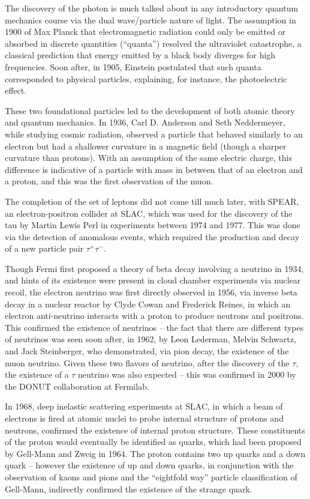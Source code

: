 The discovery of the photon is much talked about in any introductory quantum mechanics course via the 
dual wave/particle nature of light. The assumption in 1900 of Max Planck that electromagnetic radiation could only be 
emitted or absorbed in discrete quantities (``quanta'') resolved the ultraviolet catastrophe, a classical 
prediction that energy emitted by a black body diverges for high frequencies. Soon after, in 1905, Einstein postulated 
that such quanta corresponded to physical particles, explaining, for instance, the photoelectric effect.

These two foundational particles led to the development of both atomic theory and quantum mechanics. In 
1936, Carl D. Anderson and Seth Neddermeyer, while studying cosmic radiation, observed a particle that 
behaved similarly to an electron but had a shallower curvature in a magnetic field (though a sharper curvature 
than protons). With an assumption of the same electric charge, this difference is indicative of a particle 
with mass in between that of an electron and a proton, and this was the first observation of the muon.

The completion of the set of leptons did not come till much later, with SPEAR, an electron-positron collider at 
SLAC, which was used for the discovery of the tau by Martin Lewis Perl in experiments between 1974 and 1977. This was 
done via the detection of anomalous events, which required the production and decay of a new particle pair 
$\tau^{+}\tau^{-}$. 

Though Fermi first proposed a theory of beta decay involving a neutrino in 1934, and hints of its existence 
were present in cloud chamber experiments via nuclear recoil, the electron neutrino was first directly observed 
in 1956, via inverse beta decay in a nuclear reactor by Clyde Cowan and 
Frederick Reines, in which an electron anti-neutrino interacts with a proton to produce neutrons and positrons. 
This confirmed the existence of neutrinos -- the fact that there are different types of neutrinos was seen 
soon after, in 1962, by Leon Lederman, Melvin Schwartz, and Jack Steinberger, who demonstrated, via pion decay, the existence of the muon neutrino. Given these two flavors of neutrino, after the discovery of the $\tau$, the 
existence of a $\tau$ neutrino was also expected -- this was confirmed in 2000 by the DONUT collaboration at Fermilab.

In 1968, deep inelastic scattering experiments at SLAC, in which a beam of electrons is fired at atomic nuclei to probe 
internal structure of protons and neutrons, confirmed the existence of internal proton structure. These constituents 
of the proton would eventually be identified as quarks, which had been proposed by Gell-Mann and Zweig in 1964. 
The proton contains two up quarks and a down quark -- however the existence of up and down quarks, in conjunction 
with the observation of kaons and pions and the ``eightfold way'' particle classification of Gell-Mann, indirectly 
confirmed the existence of the strange quark.

